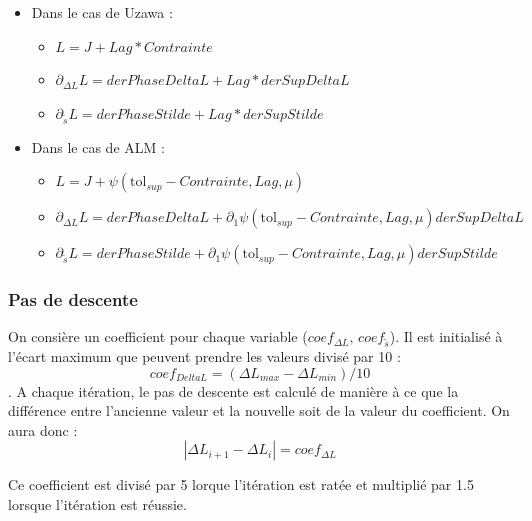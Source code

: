 \documentclass[11pt,a4paper]{article}
\begin{document}
\begin{itemize}
	\item Dans le cas de Uzawa : 
		\begin{itemize}
			\item $L=J+Lag*Contrainte$
			\item $\partial_{\Delta L}L=derPhaseDeltaL+Lag*derSupDeltaL$
			\item $\partial_{\tilde{s}}L=derPhaseStilde+Lag*derSupStilde$	
		\end{itemize}
		
	\item Dans le cas de ALM :	
		\begin{itemize}
			\item $L=J+\psi\left(\textrm{tol}_{sup}-Contrainte,Lag,\mu\right)$
			\item $\partial_{\Delta L}L=derPhaseDeltaL+\partial_1\psi\left(\textrm{tol}_{sup}-Contrainte,Lag,\mu\right)derSupDeltaL$
			\item $\partial_{\tilde{s}}L=derPhaseStilde+\partial_1\psi\left(\textrm{tol}_{sup}-Contrainte,Lag,\mu\right)derSupStilde$	
		\end{itemize}
\end{itemize}	



\subsubsection*{Pas de descente} 
On consière un coefficient pour chaque variable ($coef_{\Delta L},\,coef_{\tilde{s}}$). Il est initialisé à l'écart maximum que peuvent prendre les valeurs divisé par 10 :
\begin{equation}
coef_{Delta L}=\left(\Delta L _{max}-\Delta L_{min}\right)/10
\end{equation}. 
A chaque itération, le pas de descente est calculé de manière à ce que la différence entre l'ancienne valeur et la nouvelle soit de la valeur du coefficient. On aura donc :
\begin{equation}
|\Delta L_{i+1}-\Delta L_{i}|=coef_{\Delta L}
\end{equation}

Ce coefficient est divisé par 5 lorque l'itération est ratée et multiplié par 1.5 lorsque l'itération est réussie.
\end{document}
